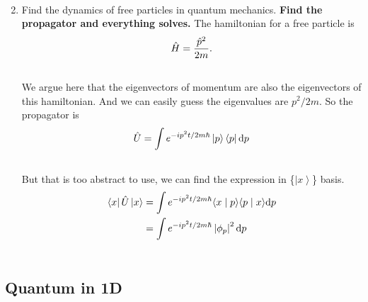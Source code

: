 \documentclass[letterpaper,10pt,english]{sphinxmanual}
\def\d{{\rm d}}
\newcommand{\bra}[1]{\left\langle #1\right|}
\newcommand{\ket}[1]{\left| #1\right\rangle}
\newcommand{\braket}[2]{\langle #1 \mid #2 \rangle}
\begin{document}
\begin{enumerate}
\begin{gather}
\end{gather}
\item {} 
Find the dynamics of free particles in quantum mechanics.
\textbf{Find the propagator and everything solves.}
The hamiltonian for a free particle is
\begin{gather}
\begin{split}\hat H = \frac{\hat p^2}{2m} .\end{split}\notag\\\begin{split}\end{split}\notag
\end{gather}
We argue here that the eigenvectors of momentum are also the eigenvectors of this hamiltonian. And we can easily guess the eigenvalues are $p^2/2m$. So the propagator is
\begin{gather}
\begin{split}\hat U = \int e^{-i p^2 t/2m\hbar} \ket{p}\bra{p} \d p\end{split}\notag\\\begin{split}\end{split}\notag
\end{gather}
But that is too abstract to use, we can find the expression in \{$\ket{x}$\} basis.
\begin{gather}
\begin{split}\bra{x}\hat U\ket{x} & =  \int e^{-i p^2 t/2 m \hbar} \braket{x}{p}\braket{p}{x} \d p    \\
& =  \int e^{-i p^2 t/2 m \hbar} \left| \phi_p \right|^2 \d p\end{split}\notag\\\begin{split}\end{split}\notag
\end{gather}
\end{enumerate}


\subsection{Quantum in 1D}
\label{QuantumMechanics:quantum-in-1d}
\end{document}
